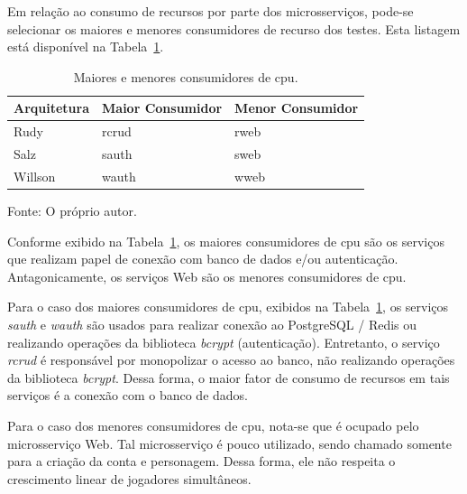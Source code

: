 Em relação ao consumo de recursos por parte dos microsserviços, pode-se selecionar os maiores e menores consumidores de recurso dos testes.
%
Esta listagem está disponível na Tabela~\ref{tab:cpu_consumo_max_min}.



\begin{table}[htb!]
\centering
\begin{adjustbox}{max width=\textwidth}
\caption{Maiores e menores consumidores de \ac{cpu}.}
\label{tab:cpu_consumo_max_min}
\begin{tabular}{|l|l|l|}

\hline

Arquitetura & Maior Consumidor & Menor Consumidor \\ \hline

Rudy        & rcrud            & rweb             \\ \hline

Salz        & sauth            & sweb             \\ \hline

Willson     & wauth             & wweb             \\ \hline

\end{tabular}
\end{adjustbox}

Fonte: O próprio autor.
\end{table}



Conforme exibido na Tabela~\ref{tab:cpu_consumo_max_min}, os maiores consumidores de \ac{cpu} são os serviços que realizam papel de conexão com banco de dados e/ou autenticação.
%
Antagonicamente, os serviços Web são os menores consumidores de \ac{cpu}.



Para o caso dos maiores consumidores de \ac{cpu}, exibidos na Tabela~\ref{tab:cpu_consumo_max_min}, os serviços \textit{sauth} e \textit{wauth} são usados para realizar conexão ao PostgreSQL / Redis ou realizando operações da biblioteca \textit{bcrypt} (autenticação).
%
Entretanto, o serviço \textit{rcrud} é responsável por monopolizar o acesso ao banco, não realizando operações da biblioteca \textit{bcrypt}.
%
Dessa forma, o maior fator de consumo de recursos em tais serviços é a conexão com o banco de dados.



Para o caso dos menores consumidores de \ac{cpu}, nota-se que é ocupado pelo microsserviço Web.
%
Tal microsserviço é pouco utilizado, sendo chamado somente para a criação da conta e personagem.
%
Dessa forma, ele não respeita o crescimento linear de jogadores simultâneos.



